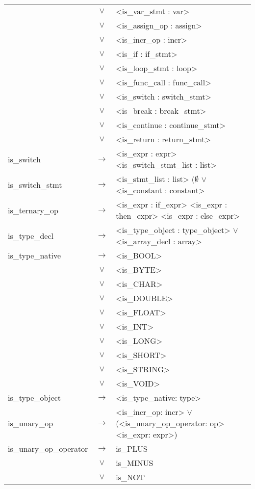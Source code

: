 \documentclass[a4paper]{article}
\begin{document}
\begin{longtable}{lcl}
								& $\vee$ & <is\_var\_stmt : var> \\
								& $\vee$ & <is\_assign\_op : assign> \\
								& $\vee$ & <is\_incr\_op : incr> \\
								& $\vee$ & <is\_if : if\_stmt> \\
								& $\vee$ & <is\_loop\_stmt : loop> \\
								& $\vee$ & <is\_func\_call : func\_call> \\
								& $\vee$ & <is\_switch : switch\_stmt> \\
								& $\vee$ & <is\_break : break\_stmt> \\
								& $\vee$ & <is\_continue : continue\_stmt> \\
								& $\vee$ & <is\_return : return\_stmt> \\
	is\_switch					& $\to$ & <is\_expr : expr> <is\_switch\_stmt\_list : list> \\
	is\_switch\_stmt			& $\to$ & <is\_stmt\_list : list> ($\emptyset$ $\vee$ <is\_constant : constant> \\
	is\_ternary\_op				& $\to$ & <is\_expr : if\_expr> <is\_expr : then\_expr> <is\_expr : else\_expr> \\
	is\_type\_decl				& $\to$ & <is\_type\_object : type\_object> $\vee$ <is\_array\_decl : array> \\
	is\_type\_native			& $\to$ & <is\_BOOL> \\
								& $\vee$ & <is\_BYTE> \\
								& $\vee$ & <is\_CHAR> \\
								& $\vee$ & <is\_DOUBLE> \\
								& $\vee$ & <is\_FLOAT> \\
								& $\vee$ & <is\_INT> \\
								& $\vee$ & <is\_LONG> \\
								& $\vee$ & <is\_SHORT> \\
								& $\vee$ & <is\_STRING> \\
								& $\vee$ & <is\_VOID> \\
	is\_type\_object			& $\to$ & <is\_type\_native: type> \\
	is\_unary\_op				& $\to$ & <is\_incr\_op: incr> $\vee$ (<is\_unary\_op\_operator: op> <is\_expr: expr>) \\
	is\_unary\_op\_operator		& $\to$ & is\_PLUS \\
								& $\vee$ & is\_MINUS \\
								& $\vee$ & is\_NOT \\

\end{longtable}
\end{document}
